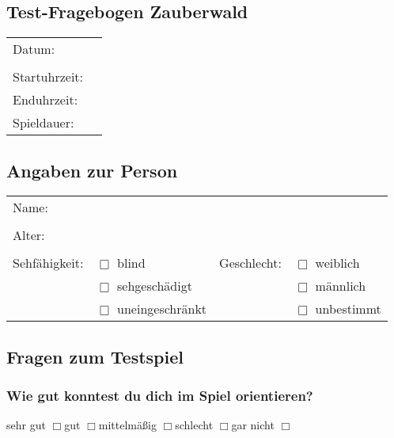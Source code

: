 \documentclass[10pt, a4paper,onecolumn]{article}
\begin{document}
\subsection*{Test-Fragebogen Zauberwald}
\begin{table}[h]
\begin{tabular}{ll}
Datum: &\\
\\
Startuhrzeit: & \\
Enduhrzeit: & \\
Spieldauer: & \\
\end{tabular}
\end{table}

\subsection*{Angaben zur Person}

\begin{table}[h]
\begin{tabular}{llll}
Name:         &  &  & \\
\\
Alter:        &  &  & \\
\\
Sehfähigkeit: & $\Box{}$ blind           & Geschlecht: & $\Box{}$ weiblich\\
			  & $\Box{}$ sehgeschädigt   & 			   & $\Box{}$ männlich\\
			  & $\Box{}$ uneingeschränkt & 			   & $\Box{}$ unbestimmt\\
\end{tabular}
\end{table}



\subsection*{Fragen zum Testspiel}

\subsubsection*{Wie gut konntest du dich im Spiel orientieren?}
\noindent
sehr gut $\Box{}$\hspace{0.5cm}gut $\Box{}$\hspace{0.5cm}mittelmäßig
$\Box{}$\hspace{0.5cm}schlecht $\Box{}$\hspace{0.5cm}gar nicht $\Box{}$
\end{document}
